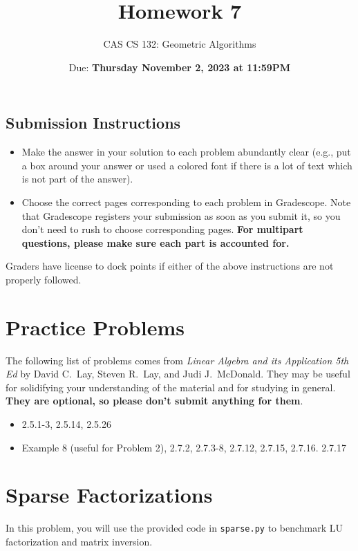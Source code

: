 \documentclass{article}
\title{
  Homework 7
}
\author{CAS CS 132: Geometric Algorithms}
\date{Due: \textbf{Thursday November 2, 2023 at 11:59PM}}
\theoremstyle{remark}
\begin{document}
\maketitle

\subsection*{Submission Instructions}
\begin{itemize}
\item Make the answer in your solution to each problem abundantly clear (e.g., put a box around your answer or used a colored font if there is a lot of text which is not part of the answer).
\item Choose the correct pages corresponding to each problem in Gradescope. Note that Gradescope registers your submission as soon as you submit it, so you don't need to rush to choose corresponding pages.
  \textbf{For multipart questions, please make sure each part is accounted for.}
\end{itemize}
Graders have license to dock points if either of the above instructions are not properly followed.


\section*{Practice Problems}

The following list of problems comes from \textit{Linear Algebra and its Application 5th Ed} by David C.\ Lay, Steven R.\ Lay, and Judi J.\ McDonald.
They may be useful for solidifying your understanding of the material and for studying in general.
\textbf{They are optional, so please don't submit anything for them}.

\begin{itemize}
\item 2.5.1-3, 2.5.14, 2.5.26
\item Example 8 (useful for Problem 2), 2.7.2, 2.7.3-8, 2.7.12, 2.7.15, 2.7.16. 2.7.17
\end{itemize}


\pagebreak
\section{Sparse Factorizations}

In this problem, you will use the provided code in \texttt{sparse.py} to benchmark LU factorization and matrix inversion.
\end{document}
